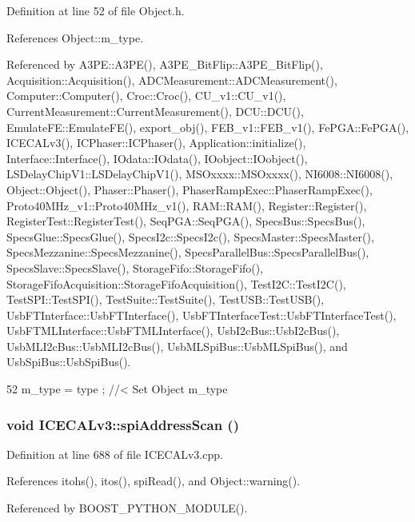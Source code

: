 Definition at line 52 of file Object.h.

References Object::m\_\-type.

Referenced by A3PE::A3PE(), A3PE\_\-BitFlip::A3PE\_\-BitFlip(), Acquisition::Acquisition(), ADCMeasurement::ADCMeasurement(), Computer::Computer(), Croc::Croc(), CU\_\-v1::CU\_\-v1(), CurrentMeasurement::CurrentMeasurement(), DCU::DCU(), EmulateFE::EmulateFE(), export\_\-obj(), FEB\_\-v1::FEB\_\-v1(), FePGA::FePGA(), ICECALv3(), ICPhaser::ICPhaser(), Application::initialize(), Interface::Interface(), IOdata::IOdata(), IOobject::IOobject(), LSDelayChipV1::LSDelayChipV1(), MSOxxxx::MSOxxxx(), NI6008::NI6008(), Object::Object(), Phaser::Phaser(), PhaserRampExec::PhaserRampExec(), Proto40MHz\_\-v1::Proto40MHz\_\-v1(), RAM::RAM(), Register::Register(), RegisterTest::RegisterTest(), SeqPGA::SeqPGA(), SpecsBus::SpecsBus(), SpecsGlue::SpecsGlue(), SpecsI2c::SpecsI2c(), SpecsMaster::SpecsMaster(), SpecsMezzanine::SpecsMezzanine(), SpecsParallelBus::SpecsParallelBus(), SpecsSlave::SpecsSlave(), StorageFifo::StorageFifo(), StorageFifoAcquisition::StorageFifoAcquisition(), TestI2C::TestI2C(), TestSPI::TestSPI(), TestSuite::TestSuite(), TestUSB::TestUSB(), UsbFTInterface::UsbFTInterface(), UsbFTInterfaceTest::UsbFTInterfaceTest(), UsbFTMLInterface::UsbFTMLInterface(), UsbI2cBus::UsbI2cBus(), UsbMLI2cBus::UsbMLI2cBus(), UsbMLSpiBus::UsbMLSpiBus(), and UsbSpiBus::UsbSpiBus().


\begin{DoxyCode}
52 { m_type  = type  ; } //< Set Object m_type
\end{DoxyCode}
\hypertarget{classICECALv3_acbf1a7a8510d7e02280bacc58badf4f4}{
\subsubsection[{spiAddressScan}]{\setlength{\rightskip}{0pt plus 5cm}void ICECALv3::spiAddressScan ()}}
\label{classICECALv3_acbf1a7a8510d7e02280bacc58badf4f4}


Definition at line 688 of file ICECALv3.cpp.

References itohs(), itos(), spiRead(), and Object::warning().

Referenced by BOOST\_\-PYTHON\_\-MODULE().



